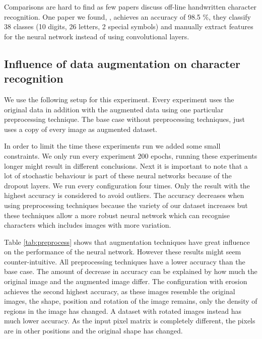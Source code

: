 \documentclass{article}
\begin{document}
Comparisons are hard to find as few papers discuss off-line handwritten character recognition.
One paper we found, \cite{charrec}, achieves an accuracy of 98.5 \%, they classify 38 classes (10 digits, 26 letters, 2 special symbols) and manually extract features for the neural network instead of using convolutional layers.

\subsection{Influence of data augmentation on character recognition}

We use the following setup for this experiment. Every experiment uses the original data in addition with the augmented data using one particular preprocessing technique. The base case without preprocessing techniques, just uses a copy of every image as augmented dataset.

In order to limit the time these experiments run we added some small constraints. We only run every experiment 200 epochs, running these experiments longer might result in different conclusions.
Next it is important to note that a lot of stochastic behaviour is part of these neural networks because of the dropout layers. We run every configuration four times. Only the result with the highest accuracy is considered to avoid outliers.
The accuracy decreases when using preprocessing techniques because the variety of our dataset increases but these techniques allow a more robust neural network which can recognise characters which includes images with more variation.

Table \ref{tab:preprocess} shows that augmentation techniques have great influence on the performance of the neural network. However these results might seem counter-intuitive.
All preprocessing techniques have a lower accuracy than the base case. The amount of decrease in accuracy can be explained by how much the original image and the augmented image differ. The configuration with erosion achieves the second highest accuracy, as these images resemble the original images, the shape, position and rotation of the image remains, only the density of regions in the image has changed. A dataset with rotated images instead has much lower accuracy. As the input pixel matrix is completely different, the pixels are in other positions and the original shape has changed.
\end{document}
